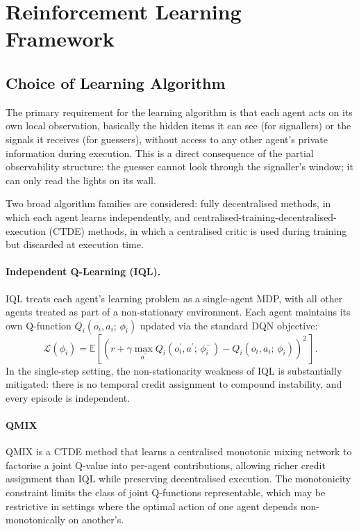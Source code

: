 \documentclass[a4paper,twoside,12pt]{report}
\begin{document}
    \section{Reinforcement Learning Framework}
    \label{sec:rl}
    
    \subsection{Choice of Learning Algorithm}
    
    The primary requirement for the learning algorithm is that each agent acts
    on its own local observation, basically the hidden items it can see (for signallers)
    or the signals it receives (for guessers),  without access to any other
    agent's private information during execution. This is a direct consequence of
    the partial observability structure: the guesser cannot look through the
    signaller's window; it can only read the lights on its wall.
    
    Two broad algorithm families are considered: fully decentralised methods, in
    which each agent learns independently, and centralised-training-decentralised-
    execution (CTDE) methods, in which a centralised critic is used during training
    but discarded at execution time.
    
    \paragraph{Independent Q-Learning (IQL).}
    IQL treats each agent's learning problem as a single-agent
    MDP, with all other agents treated as part of a non-stationary environment.
    Each agent maintains its own Q-function $Q_i(o_i, a_i;\, \phi_i)$ updated via
    the standard DQN objective:
    \begin{equation}
    \mathcal{L}(\phi_i) =
    \mathbb{E}\!\left[
    \left(
    r + \gamma \max_{a^{\prime}} Q_i\!\left(o_i^{\prime}, a^{\prime};\,
    \phi_i^{-}\right)
    - Q_i(o_i, a_i;\, \phi_i)
    \right)^{\!2}\,
    \right].
    \end{equation}
    In the single-step setting, the non-stationarity weakness of IQL is
    substantially mitigated: there is no temporal credit assignment to compound
    instability, and every episode is independent.
    
    \paragraph{QMIX }
    QMIX is a CTDE method that learns a centralised monotonic mixing network to
    factorise a joint Q-value into per-agent contributions, allowing richer credit
    assignment than IQL while preserving decentralised execution. The monotonicity
    constraint limits the class of joint Q-functions representable, which may be
    restrictive in settings where the optimal action of one agent depends
    non-monotonically on another's.
    
\end{document}
